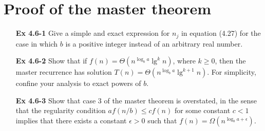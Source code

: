 \documentclass[fontsize=12pt,paper=a4]{book}
\begin{document}
\section{Proof of the master theorem}
\begin{enumerate}
 \item[\textbf{Ex 4.6-1}]
       Give a simple and exact expression for $n_j$ in equation (4.27) for the case in which $b$ is a positive integer instead of an arbitrary real number.
       
 \item[\textbf{Ex 4.6-2}]
       Show that if $f(n) = \Theta(n^{\log_b a} \lg^k n)$, where $k \geq 0$, then the master recurrence has solution $T(n) = \Theta(n^{\log_b a} \lg^{k+1} n)$. For simplicity, confine your analysis to exact powers of $b$.
       
 \item[\textbf{Ex 4.6-3}]
       Show that case 3 of the master theorem is overstated, in the sense that the regularity condition $af(n/b) \leq cf(n)$ for some constant $c < 1$ implies that there exists a constant $\epsilon > 0$ such that $f(n) = \Omega(n^{\log_b a+ \epsilon})$.
       
\end{enumerate}
\end{document}
